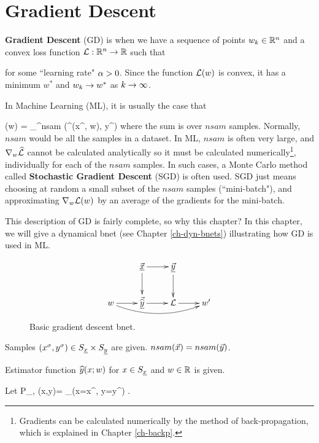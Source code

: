 \chapter{Gradient Descent}
\label{ch-gradient-descent}


{\bf Gradient Descent} (GD) is when we have a sequence of points $w_k\in{ \mathbb{R}}^n$ and a convex loss function ${\cal L}:{ \mathbb{R}}^n\rightarrow { \mathbb{R}}$ such that

\beq
{}
\label{eq-grad-descent}
\eeq
for some ``learning rate" $\alpha>0$.
Since the function ${\cal L}(w)$ is convex, 
it has a minimum $w^*$ and $w_k\rightarrow w^*$
as $k\rightarrow \infty$.

In Machine Learning (ML), it
is usually the case that

\beq
\call(w) = \sum_{}^{nsam}
\HAT{\call}(\haty^\s(x^\s, w), y^\s)
\eeq
where the sum is over $nsam$ samples. Normally, $nsam$ would be 
all the samples in a dataset.
In ML, $nsam$ is often very large, 
and $\nabla_w{\widehat{{\cal L}}} $ cannot
be calculated analytically so it must be calculated numerically\footnote{Gradients can 
be calculated numerically 
by the method of
back-propagation, which is explained in Chapter \ref{ch-backp}.},
individually for each of the $nsam$ samples. In such cases,
a Monte Carlo method called {\bf Stochastic Gradient Descent} (SGD)
is often used. 
SGD just means choosing at random
a small subset of the $nsam$ samples (``mini-batch"), and 
approximating $\nabla_w{\cal L}(w)$ by
an average of the gradients for the mini-batch.

This description of GD is fairly complete, so why this chapter? In this chapter, we will 
give a dynamical bnet (see Chapter \ref{ch-dyn-bnets}) illustrating how GD is used in ML.

\begin{figure}[h!]
\centering
$$\xymatrix{
&\vec{\rvx}\ar[d]\ar[r]&\ul{\vecy}
\ar[d]&\\
w\ar[r]\ar@/_1pc/[rrr]&
\vec{\HAT{\rvy}}\ar[r]&\call\ar[r]&w'
}$$
\caption{Basic gradient descent bnet.}
\label{fig-bfit}
\end{figure}


Samples 
$(x^\sigma, y^\sigma)\in S_{\underline{x}}\times S_{\underline{y}}$
are given. $nsam({\vec{x}})=nsam({\vec{y}})$.

Estimator function 
${\widehat{y}}(x; w)$
for $x\in S_{\underline{x}}$ and $w\in{ \mathbb{R}}$
is given.

Let 
\beq
P_{\rvx, \rvy}(x,y)=
\sum_\s \indi(x=x^\s, y=y^\s)
\;.
\eeq


